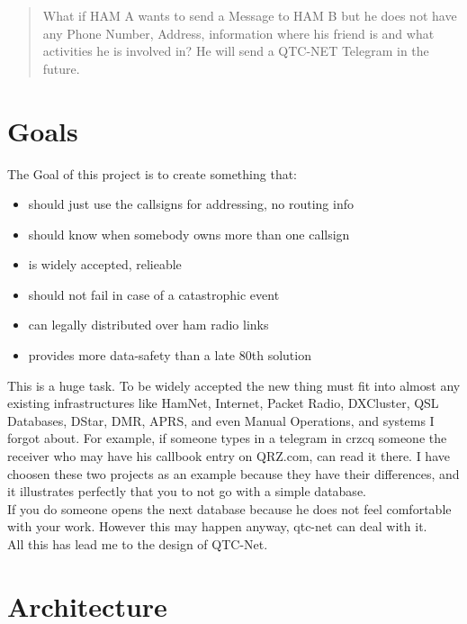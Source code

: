 


\begin{abstract}
What if HAM A wants to send a Message to HAM B but he does not have any 
Phone Number, Address, information where his friend is and what activities 
he is involved in? He will send a QTC-NET Telegram in the future. 
\end{abstract}

\section{Goals}

The Goal of this project is to create something that:

\begin{itemize}
	\item should just use the callsigns for addressing, no routing info 
	\item should know when somebody owns more than one callsign
	\item is widely accepted, relieable
	\item should not fail in case of a catastrophic event
	\item can legally distributed over ham radio links
	\item provides more data-safety than a late 80th solution
\end{itemize}

This is a huge task. To be widely accepted the new thing must fit into almost 
any existing infrastructures like HamNet, Internet, Packet Radio, DXCluster, 
QSL Databases, DStar, DMR, APRS, and even Manual Operations, and systems I 
forgot about. For example, if someone types in a telegram in crzcq someone 
the receiver who may have his callbook entry on QRZ.com, can read it there. 
I have choosen these two projects as an example because they have their 
differences, and it illustrates perfectly that you to not go with a simple 
database. \\

If you do someone opens the next database because he does not feel 
comfortable with your work. However this may happen anyway, qtc-net can deal 
with it. \\

All this has lead me to the design of QTC-Net.  


\section{Architecture}

